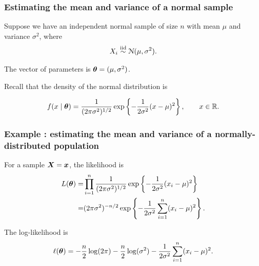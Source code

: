 \documentclass{beamer}
\begin{document}
% 
\begin{frame}
\frametitle{Estimating the mean and variance of a normal sample}
% 

\bi
\item Suppose we have an independent normal sample of  size $n$ with mean $\mu$ and variance $\sigma^2$, where
\begin{align*}
X_i \stackrel{\textnormal{iid}}{\sim} \mathcal{N}(\mu, \sigma^2).
\end{align*}
\item The vector of parameters is $\boldsymbol {\theta}=(\mu, \sigma^2)$. 
\item Recall that the density of the normal distribution is

\begin{align*}
f(x \mid \boldsymbol {\theta})=\frac{1}{(2\pi \sigma^2)^{1/2}}\exp\left\{-\frac{1}{2\sigma^2}(x-\mu)^2\right\}, \qquad x \in \mathbb{R}.
\end{align*}
\ei
\end{frame}

\begin{frame}
\frametitle{Example : estimating the mean and variance of a normally-distributed population}
\bi
\item For a sample $\boldsymbol {X}=\boldsymbol {x}$, the likelihood is 
\begin{align*}
L(\boldsymbol {\theta})=&\prod_{i=1}^n\frac{1}{({2\pi \sigma^2})^{1/2}}\exp\left\{-\frac{1}{2\sigma^2}(x_i-\mu)^2\right\}\\
=&(2\pi \sigma^2)^{-n/2}\exp\left\{-\frac{1}{2\sigma^2}\sum_{i=1}^n(x_i-\mu)^2\right\}.
\end{align*}
\item The log-likelihood is
\begin{align*}
\ell(\boldsymbol {\theta})=-\frac{n}{2}\log(2\pi) -\frac{n}{2}\log(\sigma^2)-\frac{1}{2\sigma^2}\sum_{i=1}^n (x_i-\mu)^2.
\end{align*}
\ei
\end{frame}
\end{document}
